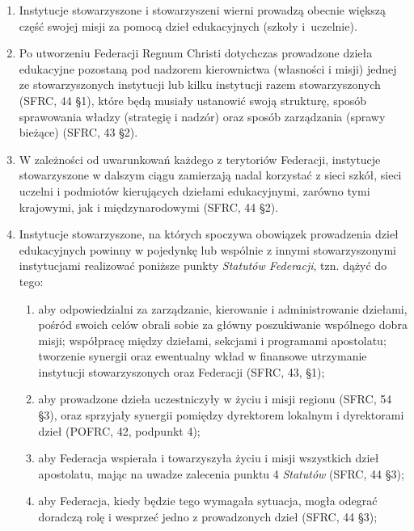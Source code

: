 \begin{enumerate}
\item Instytucje stowarzyszone i stowarzyszeni wierni prowadzą obecnie większą część swojej misji za pomocą dzieł edukacyjnych (szkoły \mbox{i uczelnie}).


\item Po utworzeniu Federacji Regnum Christi dotychczas prowadzone dzieła edukacyjne pozostaną pod nadzorem kierownictwa (własności i misji) jednej ze stowarzyszonych instytucji lub kilku instytucji razem stowarzyszonych (SFRC, 44 \S{}1), które będą musiały ustanowić swoją strukturę, sposób sprawowania władzy (strategię i nadzór) oraz sposób zarządzania (sprawy bieżące) (SFRC, 43 \S{}2).


\item W zależności od uwarunkowań każdego z terytoriów Federacji, instytucje stowarzyszone w dalszym ciągu zamierzają nadal korzystać z sieci szkół, sieci uczelni i podmiotów kierujących dziełami edukacyjnymi, zarówno tymi krajowymi, jak i międzynarodowymi (SFRC, 44 \S{}2).


\item Instytucje stowarzyszone, na których spoczywa obowiązek prowadzenia dzieł edukacyjnych powinny w pojedynkę lub wspólnie z innymi stowarzyszonymi instytucjami realizować poniższe punkty {\em Statutów Federacji}, tzn. dążyć do tego:


\begin{enumerate}


\item aby odpowiedzialni za zarządzanie, kierowanie i administrowanie dziełami, pośród swoich celów obrali sobie za główny poszukiwanie wspólnego dobra misji; współpracę między dziełami, sekcjami i programami apostolatu; tworzenie synergii oraz ewentualny wkład w finansowe utrzymanie instytucji stowarzyszonych oraz Federacji (SFRC, 43, \S{}1);


\item aby prowadzone dzieła uczestniczyły w życiu i misji regionu (SFRC, 54 \S{}3), oraz sprzyjały synergii pomiędzy dyrektorem lokalnym i dyrektorami dzieł (POFRC, 42, podpunkt 4);


\item aby Federacja wspierała i towarzyszyła życiu i misji wszystkich dzieł apostolatu, mając na uwadze zalecenia punktu 4 {\em Statutów} (SFRC, 44 \S{}3);


\item aby Federacja, kiedy będzie tego wymagała sytuacja, mogła odegrać doradczą rolę i wesprzeć jedno z prowadzonych dzieł (SFRC, 44 \S{}3);



\end{enumerate}
\end{enumerate}
